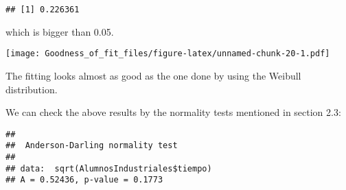 \documentclass[
]{article}
\newenvironment{Shaded}{\begin{snugshade}}{\end{snugshade}}
\newcommand{\AttributeTok}[1]{\textcolor[rgb]{0.13,0.29,0.53}{#1}}
\newcommand{\CommentTok}[1]{\textcolor[rgb]{0.56,0.35,0.01}{\textit{#1}}}
\newcommand{\ConstantTok}[1]{\textcolor[rgb]{0.56,0.35,0.01}{#1}}
\newcommand{\DecValTok}[1]{\textcolor[rgb]{0.00,0.00,0.81}{#1}}
\newcommand{\FloatTok}[1]{\textcolor[rgb]{0.00,0.00,0.81}{#1}}
\newcommand{\FunctionTok}[1]{\textcolor[rgb]{0.13,0.29,0.53}{\textbf{#1}}}
\newcommand{\NormalTok}[1]{#1}
\newcommand{\SpecialCharTok}[1]{\textcolor[rgb]{0.81,0.36,0.00}{\textbf{#1}}}
\newcommand{\StringTok}[1]{\textcolor[rgb]{0.31,0.60,0.02}{#1}}
\begin{document}
\begin{verbatim}
## [1] 0.226361
\end{verbatim}

which is bigger than 0.05.

\begin{Shaded}
\end{Shaded}

\texttt{[image: Goodness\_of\_fit\_files/figure-latex/unnamed-chunk-20-1.pdf]}

The fitting looks almost as good as the one done by using the Weibull
distribution.

We can check the above results by the normality tests mentioned in
section 2.3:

\begin{Shaded}
\end{Shaded}

\begin{verbatim}
## 
##  Anderson-Darling normality test
## 
## data:  sqrt(AlumnosIndustriales$tiempo)
## A = 0.52436, p-value = 0.1773
\end{verbatim}

\begin{Shaded}
\end{Shaded}
\end{document}
